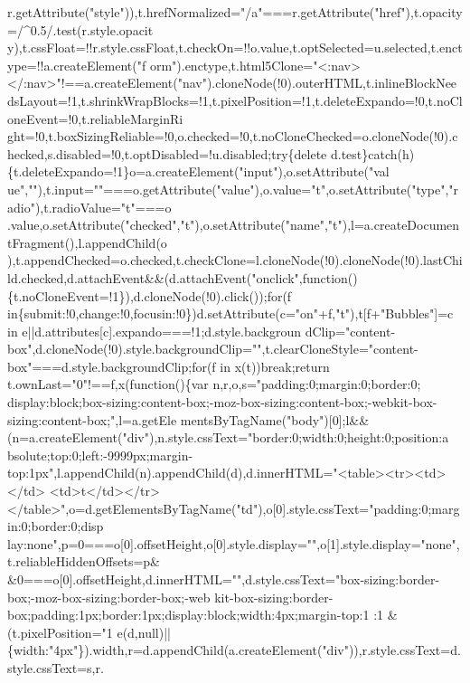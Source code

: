\begin{DoxyCode}
{      r.getAttribute("style")),t.hrefNormalized="/a"===r.getAttribute("href"),t.opacity=/^0.5/.test(r.style.opacit
      y),t.cssFloat=!!r.style.cssFloat,t.checkOn=!!o.value,t.optSelected=u.selected,t.enctype=!!a.createElement("f
      orm").enctype,t.html5Clone="<:nav></:nav>"!==a.createElement("nav").cloneNode(!0).outerHTML,t.inlineBlockNee
      dsLayout=!1,t.shrinkWrapBlocks=!1,t.pixelPosition=!1,t.deleteExpando=!0,t.noCloneEvent=!0,t.reliableMarginRi
      ght=!0,t.boxSizingReliable=!0,o.checked=!0,t.noCloneChecked=o.cloneNode(!0).checked,s.disabled=!0,t.optDisabled=!u.disabled;try\{delete
       d.test\}catch(h)\{t.deleteExpando=!1\}o=a.createElement("input"),o.setAttribute("val
      ue",""),t.input=""===o.getAttribute("value"),o.value="t",o.setAttribute("type","radio"),t.radioValue="t"===o
      .value,o.setAttribute("checked","t"),o.setAttribute("name","t"),l=a.createDocumentFragment(),l.appendChild(o
      ),t.appendChecked=o.checked,t.checkClone=l.cloneNode(!0).cloneNode(!0).lastChild.checked,d.attachEvent&&(d.attachEvent("onclick",function()\{t.noCloneEvent=!1\}),d.cloneNode(!0).click());for(f
       in\{submit:!0,change:!0,focusin:!0\})d.setAttribute(c="on"+f,"t"),t[f+"Bubbles"]=c in
       e||d.attributes[c].expando===!1;d.style.backgroun
      dClip="content-box",d.cloneNode(!0).style.backgroundClip="",t.clearCloneStyle="content-box"===d.style.backgroundClip;for(f in x(t))break;return t.ownLast="0"!==f,x(function()\{var
       n,r,o,s="padding:0;margin:0;border:0;
      display:block;box-sizing:content-box;-moz-box-sizing:content-box;-webkit-box-sizing:content-box;",l=a.getEle
      mentsByTagName("body")[0];l&&(n=a.createElement("div"),n.style.cssText="border:0;width:0;height:0;position:a
      bsolute;top:0;left:-9999px;margin-top:1px",l.appendChild(n).appendChild(d),d.innerHTML="<table><tr><td></td>
      <td>t</td></tr></table>",o=d.getElementsByTagName("td"),o[0].style.cssText="padding:0;margin:0;border:0;disp
      lay:none",p=0===o[0].offsetHeight,o[0].style.display="",o[1].style.display="none",t.reliableHiddenOffsets=p&
      &0===o[0].offsetHeight,d.innerHTML="",d.style.cssText="box-sizing:border-box;-moz-box-sizing:border-box;-web
      kit-box-sizing:border-box;padding:1px;border:1px;display:block;width:4px;margin-top:1%
      :1%
      &(t.pixelPosition="1%
      e(d,null)||\{width:"4px"\}).width,r=d.appendChild(a.createElement("div")),r.style.cssText=d.style.cssText=s,r.
}
\end{DoxyCode}
